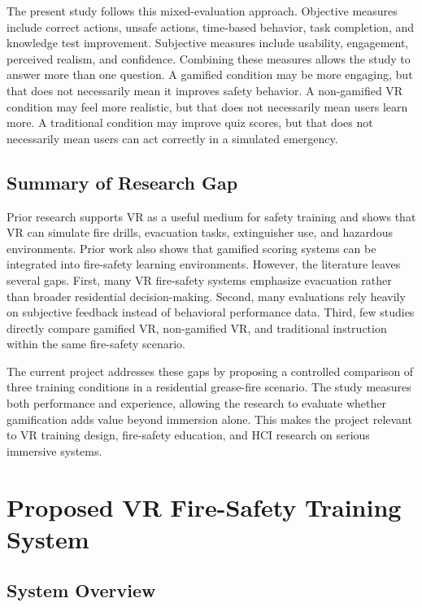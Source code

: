 \documentclass[manuscript, review]{acmart}
\begin{document}
{The present study follows this mixed-evaluation approach. Objective measures include correct actions, unsafe actions, time-based behavior, task completion, and knowledge test improvement. Subjective measures include usability, engagement, perceived realism, and confidence. Combining these measures allows the study to answer more than one question. A gamified condition may be more engaging, but that does not necessarily mean it improves safety behavior. A non-gamified VR condition may feel more realistic, but that does not necessarily mean users learn more. A traditional condition may improve quiz scores, but that does not necessarily mean users can act correctly in a simulated emergency.

\subsection{Summary of Research Gap}

Prior research supports VR as a useful medium for safety training and shows that VR can simulate fire drills, evacuation tasks, extinguisher use, and hazardous environments. Prior work also shows that gamified scoring systems can be integrated into fire-safety learning environments. However, the literature leaves several gaps. First, many VR fire-safety systems emphasize evacuation rather than broader residential decision-making. Second, many evaluations rely heavily on subjective feedback instead of behavioral performance data. Third, few studies directly compare gamified VR, non-gamified VR, and traditional instruction within the same fire-safety scenario.

The current project addresses these gaps by proposing a controlled comparison of three training conditions in a residential grease-fire scenario. The study measures both performance and experience, allowing the research to evaluate whether gamification adds value beyond immersion alone. This makes the project relevant to VR training design, fire-safety education, and HCI research on serious immersive systems.

\section{Proposed VR Fire-Safety Training System}
\label{sec:system}

\subsection{System Overview}

}
\end{document}
